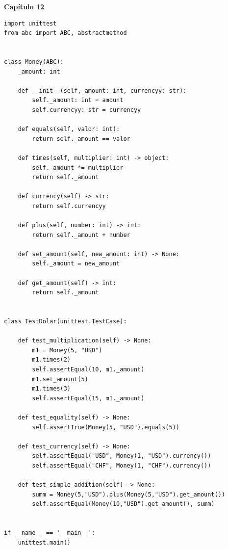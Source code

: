 \documentclass[a4paper,12pt]{article}
\newcommand{\capitulo}[1]{
    \vspace{1em}
    \noindent
    \colorbox{black!15}{
        \parbox{\dimexpr\linewidth-2\fboxsep}{
            \centering \Large \textbf{#1}
        }
    }
    \vspace{1em}
}
\begin{document}
\capitulo{Capítulo 12}
\begin{lstlisting}[style=pythonstyle]
import unittest
from abc import ABC, abstractmethod


class Money(ABC):
    _amount: int

    def __init__(self, amount: int, currencyy: str):
        self._amount: int = amount
        self.currencyy: str = currencyy 

    def equals(self, valor: int):
        return self._amount == valor 

    def times(self, multiplier: int) -> object:
        self._amount *= multiplier
        return self._amount

    def currency(self) -> str:
        return self.currencyy

    def plus(self, number: int) -> int:
        return self._amount + number 

    def set_amount(self, new_amount: int) -> None:
        self._amount = new_amount

    def get_amount(self) -> int:
        return self._amount


class TestDolar(unittest.TestCase):

    def test_multiplication(self) -> None:
        m1 = Money(5, "USD")
        m1.times(2) 
        self.assertEqual(10, m1._amount)
        m1.set_amount(5)
        m1.times(3) 
        self.assertEqual(15, m1._amount)

    def test_equality(self) -> None:
        self.assertTrue(Money(5, "USD").equals(5))

    def test_currency(self) -> None:
        self.assertEqual("USD", Money(1, "USD").currency())
        self.assertEqual("CHF", Money(1, "CHF").currency())

    def test_simple_addition(self) -> None:
        summ = Money(5,"USD").plus(Money(5,"USD").get_amount())
        self.assertEqual(Money(10,"USD").get_amount(), summ)


if __name__ == '__main__':
    unittest.main()
\end{lstlisting}
\end{document}
